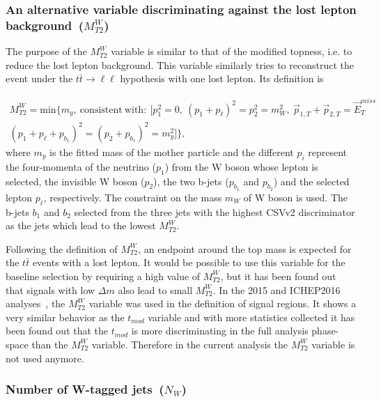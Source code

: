 \subsubsection{An alternative variable discriminating against the lost lepton background~($M_{T2}^{W}$)~\label{sec:mt2w}}

The purpose of the $M_{T2}^{W}$ variable is similar to that of the modified topness, i.e. to reduce the lost lepton background. This variable similarly tries to reconstruct the event under the $t \bar{t} \to \ell \ell$ hypothesis with one lost lepton. Its definition is

\begin{equation}
\begin{split}
M_{T2}^{W} = \mathrm{min}\{m_{y},~\mathrm{consistent~with:}~[p_{1}^{2}=0,~(p_{1}+p_{\ell})^{2} = p_{2}^{2} =m_{W}^{2},~ \vec{p}_{1,T}+\vec{p}_{2,T}= \vec{E}_{T}^{miss} \\
(p_{1} + p_{\ell} + p_{b_{1}})^{2} =  (p_{2} + p_{b_{1}})^{2} = m_{y}^{2}]\},
\end{split}
\end{equation}
where $m_{y}$ is the fitted mass of the mother particle and the different $p_{i}$ represent the four-momenta of the neutrino ($p_{1}$) from the W boson whose lepton is selected, the invisible W boson ($p_{2}$), the two b-jets ($p_{b_{1}}$ and $p_{b_{2}}$) and the selected lepton $p_{\ell}$, respectively. The constraint on the mass $m_{W}$ of W boson is used. The b-jets $b_{1}$ and $b_{2}$ selected from the three jets with the highest CSVv2 discriminator as the jets which lead to the lowest $M_{T2}^{W}$.

Following the definition of $M_{T2}^{W}$,  an endpoint around the top mass is expected for the $t\bar{t}$ events with a lost lepton. It would be possible to use this variable for the baseline selection by requiring a high value of $M_{T2}^{W}$, but it has been found out that signals with low $\Delta m$ also lead to small $M_{T2}^{W}$. In the 2015 and ICHEP2016 analyses~\cite{Sirunyan:2016jpr, CMS:2016vew}, the $M_{T2}^{W}$ variable was used in the definition of signal regions. It shows a  very similar behavior as the $t_{mod}$ variable and with more statistics collected it has been found out that the $t_{mod}$ is more discriminating in the full analysis phase-space than the $M_{T2}^{W}$ variable. Therefore in the current analysis the $M_{T2}^{W}$ variable is not used anymore.


\subsubsection{Number of W-tagged jets~($N_{W}$)}

